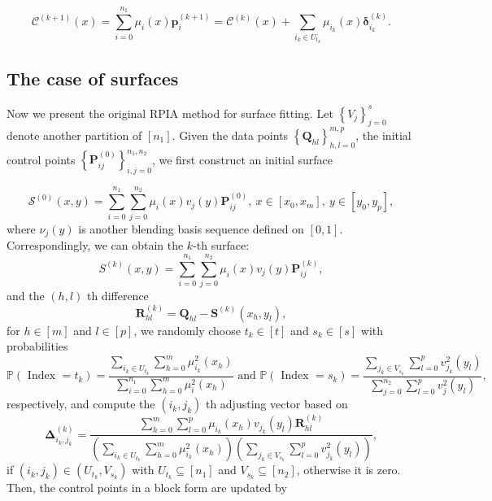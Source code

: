 \documentclass[11pt]{article}
\numberwithin{equation}{section}
\begin{document}
$$
\mathcal{C}^{(k+1)}(x)=\sum_{i=0}^{n_{1}} \mu_{i}(x) \boldsymbol{p}_{i}^{(k+1)}=\mathcal{C}^{(k)}(x)+\sum_{i_{k} \in U_{t_{k}}} \mu_{i_{k}}(x) \boldsymbol{\delta}_{i_{k}}^{(k)} .
$$
\subsection{The case of surfaces}
Now we present the original RPIA method for surface fitting. Let $\left\{V_{j}\right\}_{j=0}^{s}$ denote another partition of $\left[n_{1}\right]$. Given the data points $\left\{\boldsymbol{Q}_{h l}\right\}_{h, l=0}^{m, p}$, the initial control points $\left\{\boldsymbol{P}_{i j}^{(0)}\right\}_{i, j=0}^{n_{1}, n_{2}}$, we first construct an initial surface

$$
\mathcal{S}^{(0)}(x, y)=\sum_{i=0}^{n_{1}} \sum_{j=0}^{n_{2}} \mu_{i}(x) v_{j}(y) \boldsymbol{P}_{i j}^{(0)}, ~x \in\left[x_{0}, x_{m}\right], ~y \in\left[y_{0}, y_{p}\right],
$$
where $\nu_j(y)$ is another blending basis sequence defined on $[0,1]$. Correspondingly, we can obtain the $k$-th surface:
$$
S^{(k)}(x, y)=\sum_{i=0}^{n_{1}} \sum_{j=0}^{n_{2}} \mu_{i}(x) v_{j}(y) \boldsymbol{P}_{i j}^{(k)},
$$
and the $(h, l)$ th difference
\begin{equation*}
\boldsymbol{R}_{h l}^{(k)}=\boldsymbol{Q}_{h l}-\boldsymbol{S}^{(k)}\left(x_{h}, y_{l}\right),
\end{equation*}
for $h \in[m]$ and $l \in[p]$, we randomly choose $t_{k} \in[t]$ and $s_{k} \in[s]$ with probabilities
\begin{equation*}
\mathbb{P}\left(\text { Index }=t_{k}\right)=\frac{\sum_{i_{k} \in U_{t_{k}}} \sum_{h=0}^{m} \mu_{i_{k}}^{2}\left(x_{h}\right)}{\sum_{i=0}^{n_{1}} \sum_{h=0}^{m} \mu_{i}^{2}\left(x_{h}\right)} \text { and } \mathbb{P}\left(\text { Index }=s_{k}\right)=\frac{\sum_{j_{k} \in V_{s_{k}}} \sum_{l=0}^{p} v_{j_{k}}^{2}\left(y_{l}\right)}{\sum_{j=0}^{n_{2}} \sum_{l=0}^{p} v_{j}^{2}\left(y_{l}\right)}, 
\end{equation*}
respectively, and compute the $\left(i_{k}, j_{k}\right)$ th adjusting vector based on
\begin{equation*}
\boldsymbol{\Delta}_{i_{k}, j_{k}}^{(k)}=\frac{\sum_{h=0}^{m} \sum_{l=0}^{p} \mu_{i_{k}}\left(x_{h}\right) v_{j_{k}}\left(y_{l}\right) \boldsymbol{R}_{h l}^{(k)}}{\left(\sum_{i_{k} \in U_{t_{k}}} \sum_{h=0}^{m} \mu_{i_{k}}^{2}\left(x_{h}\right)\right)\left(\sum_{j_{k} \in V_{s_{k}}} \sum_{l=0}^{p} v_{j_{k}}^{2}\left(y_{l}\right)\right)},
\end{equation*}
if $\left(i_{k}, j_{k}\right) \in\left(U_{t_{k}}, V_{s_{k}}\right)$ with $U_{t_{k}} \subseteq\left[n_{1}\right]$ and $V_{s_{k}} \subseteq\left[n_{2}\right]$, otherwise it is zero. Then, the control points in a block form are updated by
\end{document}

